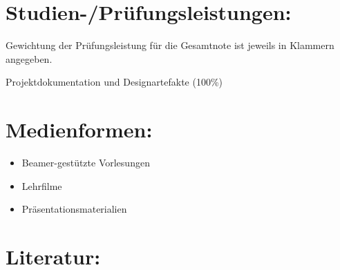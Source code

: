\section*{Studien-/Prüfungsleistungen:\label{/mi-2017/modulbeschreibungen-master/MA_HCI_InteractionDesign}}\label{studien-pruxfcfungsleistungenpathlabelmi-2017modulbeschreibungen-mastermaux5fhciux5finteractiondesign}

Gewichtung der Prüfungsleistung für die Gesamtnote ist jeweils in
Klammern angegeben.

Projektdokumentation und Designartefakte (100\%)

\section*{Medienformen:\label{/mi-2017/modulbeschreibungen-master/MA_HCI_InteractionDesign}}\label{medienformenpathlabelmi-2017modulbeschreibungen-mastermaux5fhciux5finteractiondesign}

\begin{itemize}
\tightlist
\item
  Beamer-gestützte Vorlesungen
\item
  Lehrfilme
\item
  Präsentationsmaterialien
\end{itemize}

\section*{Literatur:\label{/mi-2017/modulbeschreibungen-master/MA_HCI_InteractionDesign}}\label{literaturpathlabelmi-2017modulbeschreibungen-mastermaux5fhciux5finteractiondesign}

